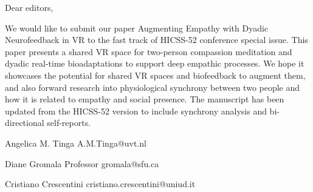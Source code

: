 Dear editors,

We would like to submit our paper Augmenting Empathy with Dyadic Neurofeedback in VR to the fast track of HICSS-52 conference special issue. This paper presents a shared VR space for two-person compassion meditation and dyadic real-time bioadaptations to support deep empathic processes. We hope it showcases the potential for shared VR spaces and biofeedback to augment them, and also forward research into physiological synchrony between two people and how it is related to empathy and social presence. The manuscript has been updated from the HICSS-52 version to include synchrony analysis and bi-directional self-reports.

Angelica M. Tinga        A.M.Tinga@uvt.nl

Diane Gromala
Professor
 gromala@sfu.ca
 
 Cristiano Crescentini
cristiano.crescentini@uniud.it